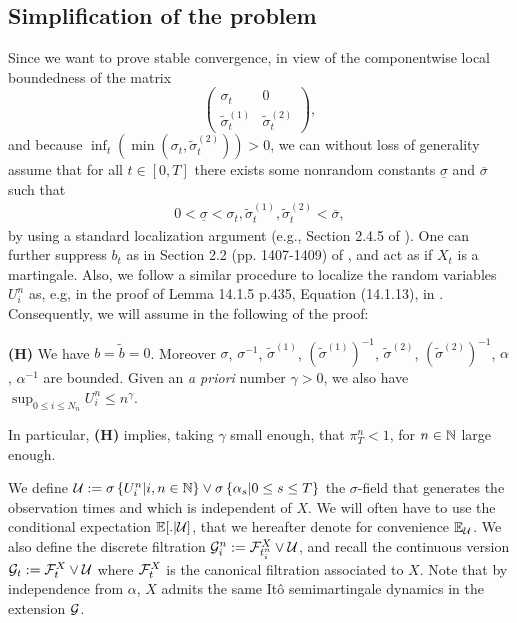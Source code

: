 \documentclass[11pt]{article}
\numberwithin{equation}{section}
\newcommand{\ti}[1]{t_{#1}^n}
\theoremstyle{plain}
\theoremstyle{remark}
\begin{document}
\subsection{Simplification of the problem}  \label{simplification}
Since we want to prove stable convergence, in view of the componentwise local boundedness of the matrix
$$\left(\begin{matrix}  \sigma_t & 0 \\ 
\tilde{\sigma}_t^{(1)} & \tilde{\sigma}_t^{(2)} 
\end{matrix}\right),$$ 
 and because $\inf_t (\min(\sigma_t, \tilde{\sigma}_t^{(2)})) > 0$,
we can without loss of generality assume that for all $t \in [0,T]$ there exists some nonrandom constants $\underline{\sigma}$ and $\overline{\sigma}$ such that
\begin{eqnarray}
\label{smsp}
0 < \underline{\sigma} < \sigma_t, \tilde{\sigma}_t^{(1)}, \tilde{\sigma}_t^{(2)} < \overline{\sigma},
\end{eqnarray}
by using a standard localization argument (e.g., Section 2.4.5 of \cite{mykland2012econometrics}). One can further suppress $b_t$ as in Section 2.2 (pp. 1407-1409) of \cite{mykland2009inference}, and act as if 
$X_t$ is a martingale. Also, we follow a similar procedure to localize the random variables $U_i^n$ as, e.g, in the proof of Lemma 14.1.5 p.435, Equation (14.1.13), in \cite{jacod2011discretization}. Consequently, we will assume in the following of the proof: 

\textbf { (H) } We have $b = \tilde{b} = 0$. Moreover $\sigma$, $\sigma^{-1}$, $\tilde{\sigma}^{(1)}$, $(\tilde{\sigma}^{(1)})^{-1}$, $\tilde{\sigma}^{(2)}$, $(\tilde{\sigma}^{(2)})^{-1}$,  $\alpha$, $\alpha^{-1}$ are bounded. Given an \textit{a priori} number $\gamma >0$, we also have $\sup_{0 \leq i \leq N_n} U_i^n \leq n^{\gamma}$. 

\smallskip
In particular, \textbf{(H)} implies, taking $\gamma$ small enough, that $\pi_
T^n < 1$, for $n \in \mathbb{N}$ large enough.

\smallskip
We define ${\cal U} := \sigma \left\{U_i^n | i,n \in \mathbb{N} \right\} \vee \sigma \left\{ \alpha_s | 0 \leq s \leq T\right\}$ the $\sigma$-field that generates the observation times and which is independent of $X$. We will often have to use the conditional expectation $\mathbb{E}[.|{\cal U}]$, that we hereafter denote for convenience $\mathbb{E}_{{\cal U}}$. We also define the discrete filtration $\calg_i^n := \calf_{\ti{i}}^X \vee \calu$, and recall the continuous version ${\cal G}_t := {\cal F}_t^X \vee {\cal U}$ where ${\cal F}_t^X$ is the canonical filtration associated to $X$. Note that by independence from $\alpha$, $X$ admits the same It\^{o} semimartingale dynamics in the extension ${\cal G}$.
\end{document}
